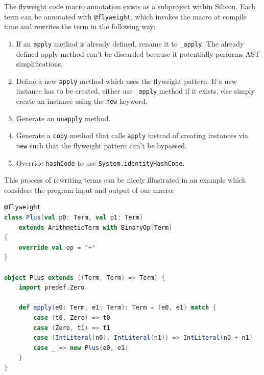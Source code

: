 \documentclass[11pt]{article}
\begin{document}
    The flyweight code macro annotation exists as a subproject within Silicon. Each term can be
    annotated with \texttt{@flyweight}, which invokes the macro at compile time and 
    rewrites the term in the following way:

    \begin{enumerate}
        \item If an \texttt{apply} method is already defined, rename it to \texttt{\_apply}.
            The already defined apply method can't be discarded because it potentially
            performs AST simplifications.
        \item Define a new \texttt{apply} method which uses the flyweight pattern.
            If a new instance has to be created, either use \texttt{\_apply} method
            if it exists, else simply create an instance using the \texttt{new} keyword.
        \item Generate an \texttt{unapply} method.
        \item Generate a \texttt{copy} method that calls \texttt{apply} instead of creating
            instances via \texttt{new} such that the flyweight pattern can't be bypassed.
        \item Override \texttt{hashCode} to use \texttt{System.identityHashCode}.
    \end{enumerate}

    This process of rewriting terms can be nicely illustrated in an example
    which considers the program input and output of our macro:

    \begin{lstlisting}[language=Scala, caption={Input code given to the macro.}, label={lst:macro-input}]
@flyweight
class Plus(val p0: Term, val p1: Term)
    extends ArithmeticTerm with BinaryOp[Term]
{
    override val op = "+"
}

object Plus extends ((Term, Term) => Term) {
    import predef.Zero

    def apply(e0: Term, e1: Term): Term = (e0, e1) match {
        case (t0, Zero) => t0
        case (Zero, t1) => t1
        case (IntLiteral(n0), IntLiteral(n1)) => IntLiteral(n0 + n1)
        case _ => new Plus(e0, e1)
    }
}        
    \end{lstlisting}
\end{document}
